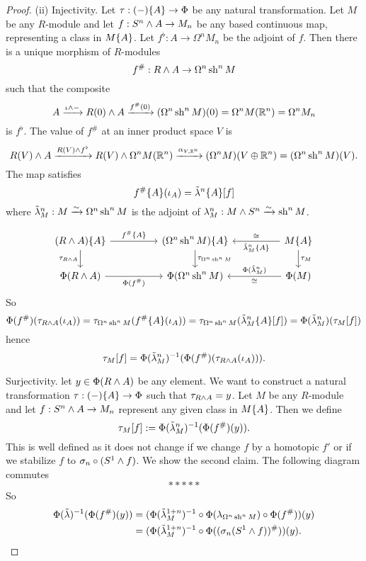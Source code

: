 \begin{proof}
(ii) Injectivity. Let $\tau:(-)\{A\}\to\Phi$ be any natural transformation. Let $M$ be any $R$-module and let $f:S^n\wedge A\to M_n$ be any based continuous map, representing a class in $M\{A\}$. Let $f^\flat:A\to\Omega^n M_n$ be the adjoint of $f$. Then there is a unique morphism of $R$-modules
\[f^\#:R\wedge A\to\Omega^n\operatorname{sh}^n M\]
such that the composite
\[A\xrightarrow{\iota\wedge-}R(0)\wedge A\xrightarrow{f^\#(0)}(\Omega^n\operatorname{sh}^n M)(0)=\Omega^n M({\mathbb R}^n)=\Omega^n M_n\]
is $f^\flat$. The value of $f^\#$ at an inner product space $V$ is
\[R(V)\wedge A\xrightarrow{R(V)\wedge f^\flat}R(V)\wedge\Omega^n M({\mathbb R}^n)\xrightarrow{\alpha_{V,{\mathbb R}^n}}(\Omega^n M)(V\oplus{\mathbb R}^n)=(\Omega^n\operatorname{sh}^n M)(V).\]
The map satisfies
\[f^\#\{A\}(\iota_A)=\tilde\lambda^n\{A\}[f]\]
where $\tilde\lambda^n_M:M\xrightarrow{\sim}\Omega^n\operatorname{sh}^n M$ is the adjoint of $\lambda^n_M:M\wedge S^n\xrightarrow{\sim}\operatorname{sh}^n M$.

\[
\begin{tikzcd}[column sep=huge]
(R\smsh A)\cb{A} \ar[d,"\tau_{R\smsh A}"'] \ar[r,"f^\#\cb{A}"] & (\Omega^n\sh^n M)\cb{A} \ar[d,"\tau_{\Omega^n\sh^n M}"] & M\cb{A} \ar[l,"\til\lambda^n_M\cb{A}","\cong"'] \ar[d,"\tau_M"]\\
\Phi(R\smsh A) \ar[r,"\Phi(f^\#)"'] & \Phi(\Omega^n\sh^n M) & \Phi(M) \ar[l,"\Phi(\til\lambda^n_M)"',"\cong"]
\end{tikzcd}
\]
So
\[\Phi(f^\#)(\tau_{R\wedge A}(\iota_A))=\tau_{\Omega^n\operatorname{sh}^n M}(f^\#\{A\}(\iota_A))=\tau_{\Omega^n\operatorname{sh}^n M}(\tilde\lambda^n_M\{A\}[f])=\Phi(\tilde\lambda^n_M)(\tau_M[f])\]
hence
\[\tau_M[f]=\Phi(\tilde\lambda^n_M)^{-1}(\Phi(f^\#)(\tau_{R\wedge A}(\iota_A))).\]

Surjectivity. let $y\in\Phi(R\wedge A)$ be any element. We want to construct a natural transformation $\tau:(-)\{A\}\to\Phi$ such that $\tau_{R\wedge A}=y$. Let $M$ be any $R$-module and let $f:S^n\wedge A\to M_n$ represent any given class in $M\{A\}$. Then we define
\[\tau_M[f]:=\Phi(\tilde\lambda^n_M)^{-1}(\Phi(f^\#)(y)).\]
This is well defined as it does not change if we change $f$ by a homotopic $f'$ or if we stabilize $f$ to $\sigma_n\circ(S^1\wedge f)$. We show the second claim. The following diagram commutes
\[
*****
\]
So
\begin{align*}
    \Phi(\tilde\lambda)^{-1}(\Phi(f^\#)(y))&=(\Phi(\tilde\lambda^{1+n}_M)^{-1}\circ\Phi(\lambda_{\Omega^n\operatorname{sh}^n M})\circ\Phi(f^\#))(y)\\
    &=(\Phi(\tilde\lambda^{1+n}_M)^{-1}\circ\Phi((\sigma_n(S^1\wedge f))^\#))(y).
\end{align*}


\end{proof}
